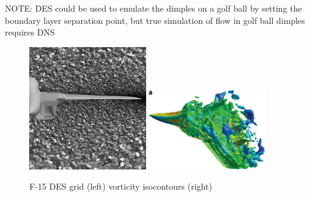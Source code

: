 \documentclass[journal]{new-aiaa}
\begin{document}
NOTE: DES could be used to emulate the dimples on a golf ball by setting the boundary layer separation point, but true simulation of flow in golf ball dimples requires DNS




\begin{figure}[H]
\begin{center}
\includegraphics[width=0.45\textwidth]{Images/logan/forsythe2004detachededdy_f15grid.pdf}
\includegraphics[width=0.45\textwidth]{Images/logan/spalart2009detachededdy_f15des.pdf}
\caption{ F-15 DES grid (left) \cite{forsythe2004detachededdy} vorticity isocontours (right) \cite{spalart2009detachededdy} }
\label{fig:f15des}
\end{center}
\end{figure}
\end{document}
